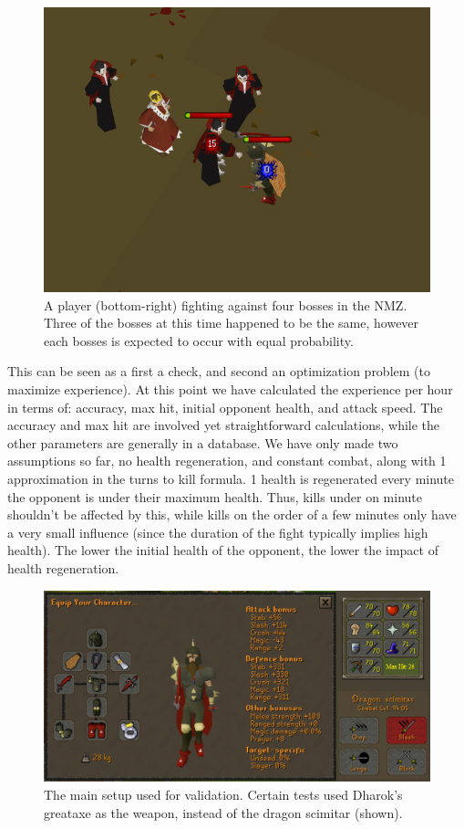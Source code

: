 \documentclass[../../main.tex]{subfiles}
\begin{document}
		\begin{figure}
			\includegraphics[width=\linewidth]{img/NMZ.png}
			\caption{A player (bottom-right) fighting against four bosses in the NMZ. Three of the bosses at this time happened to be the same, however each bosses is expected to occur with equal probability.}
			\label{fig:nmz}
		\end{figure}

		This can be seen as a first a check, and second an optimization problem (to maximize experience). At this point we have calculated the experience per hour in terms of: accuracy, max hit, initial opponent health, and attack speed. The accuracy and max hit are involved yet straightforward calculations, while the other parameters are generally in a database. We have only made two assumptions so far, no health regeneration, and constant combat, along with 1 approximation in the turns to kill formula. 1 health is regenerated every minute the opponent is under their maximum health. Thus, kills under on minute shouldn't be affected by this, while kills on the order of a few minutes only have a very small influence (since the duration of the fight typically implies high health). The lower the initial health of the opponent, the lower the impact of health regeneration.

		\begin{figure}
			\includegraphics[width=\linewidth]{img/Details.png}
			\caption{The main setup used for validation. Certain tests used Dharok's greataxe as the weapon, instead of the dragon scimitar (shown).}
			\label{fig:setup}
		\end{figure}
\end{document}
